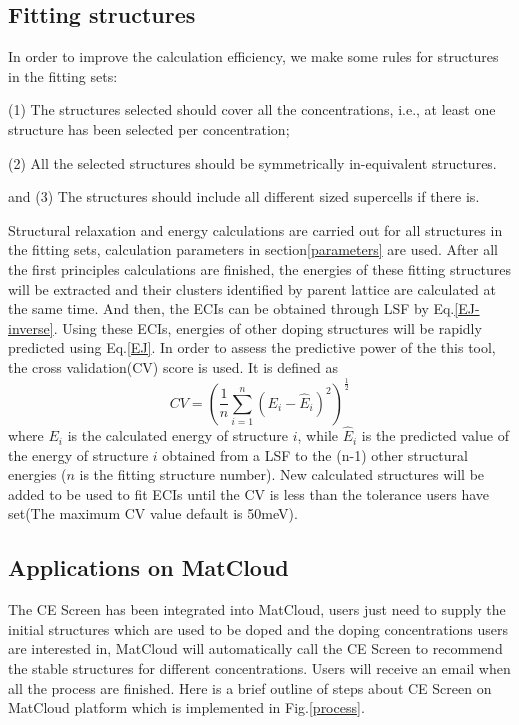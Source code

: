 \documentclass[aps,preprint,amsmath,amssymb]{revtex4}
\begin{document}
\subsection{Fitting structures}\label{select_rules}
In order to improve the calculation efficiency, we make some rules for structures in the fitting sets:

(1) The structures selected should cover all the concentrations, i.e.,
at least one structure has been selected per concentration;

(2) All the selected structures should be symmetrically in-equivalent structures.

and (3) The structures should include all different sized supercells if there is.

Structural relaxation and energy calculations are carried out for all structures in the fitting sets,
calculation parameters in section\ref{parameters} are used.
After all the first principles calculations are finished,
the energies of these fitting structures will be extracted and their clusters identified by parent lattice are calculated at the same time.
And then, the ECIs can be obtained through LSF by Eq.\ref{EJ-inverse}.
Using these ECIs, energies of other doping structures will be rapidly predicted using Eq.\ref{EJ}.
In order to assess the predictive power of the this tool, the cross validation(CV) score is used.
It is defined as
\begin{equation}\label{cv-score}
  CV=\left(\frac{1}{n}\sum_{i=1}^{n}(E_{i}-\hat{E}_{i})^{2}\right)^{\frac{1}{2}}
\end{equation}
where $E_{i}$ is the calculated energy of structure $i$, while $\hat{E}_{i}$ is the predicted value of the energy of structure $i$ obtained from
a LSF to the (n-1) other structural energies ($n$ is the fitting structure number).
New calculated structures will be added to be used to fit ECIs
until the CV is less than the tolerance users have set(The maximum CV value default is 50meV).
\subsection{Applications on MatCloud}
The CE Screen has been integrated into MatCloud,
users just need to supply the initial structures which are used to be doped and the doping concentrations users are
interested in, MatCloud will automatically call the CE Screen to
recommend the stable structures for different concentrations.
Users will receive an email when all the process are finished.
Here is a brief outline of steps about CE Screen on MatCloud platform which is implemented in Fig.\ref{process}.
\end{document}
